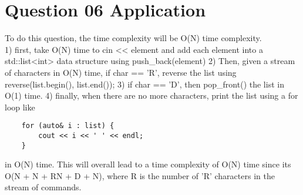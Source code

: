 \documentclass{article}
\begin{document}
\section{Question 06 Application}

To do this question, the time complexity will be O(N) time complexity.
\\
1) first, take O(N) time to cin << element and add each element into a std::list<int> data structure using push\_back(element)
2) Then, given a stream of characters in O(N) time, if char == 'R', reverse the list using reverse(list.begin(), list.end());
3) if char == 'D', then pop\_front() the list in O(1) time.
4) finally, when there are no more characters, print the list using a for loop like
\begin{verbatim}
    for (auto& i : list) {
        cout << i << ' ' << endl;
    } 
\end{verbatim}

in O(N) time.
This will overall lead to a time complexity of O(N) time since its O(N + N + RN + D + N), where R is the number of 'R' characters in the stream of commands.
\end{document}
